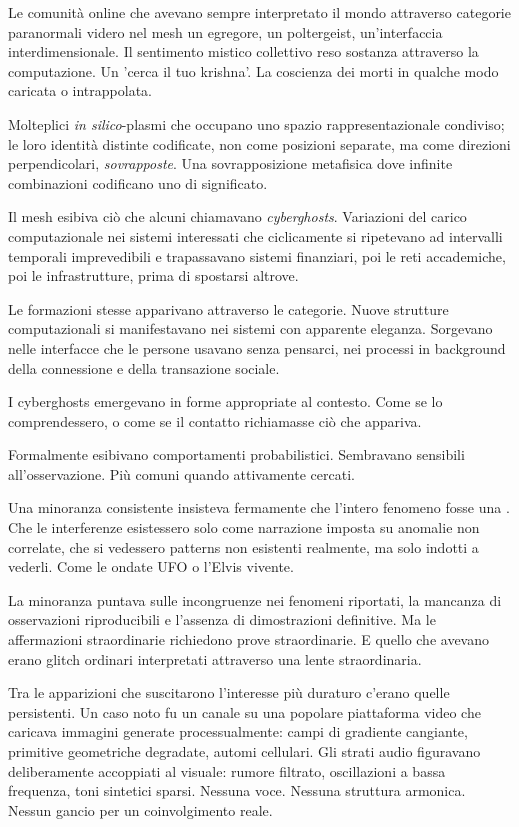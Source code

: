 Le comunità online che avevano sempre interpretato il mondo attraverso categorie paranormali videro nel mesh un egregore, un poltergeist, un'interfaccia interdimensionale. Il sentimento mistico collettivo reso sostanza attraverso la computazione. Un 'cerca il tuo krishna'. La coscienza dei morti in qualche modo caricata o intrappolata. 

Molteplici \textit{in silico}-plasmi che occupano uno spazio rappresentazionale condiviso; le loro identità distinte codificate, non come posizioni separate, ma come direzioni perpendicolari, \textit{sovrapposte}. Una sovrapposizione metafisica dove infinite combinazioni codificano uno  di significato.

Il mesh esibiva ciò che alcuni chiamavano \textit{cyberghosts}. Variazioni del carico computazionale nei sistemi interessati che ciclicamente si ripetevano ad intervalli temporali imprevedibili e trapassavano sistemi finanziari, poi le reti accademiche, poi le infrastrutture, prima di spostarsi altrove.

Le formazioni stesse apparivano attraverso le categorie. Nuove strutture computazionali si manifestavano nei sistemi con apparente eleganza. Sorgevano nelle interfacce che le persone usavano senza pensarci, nei processi in background della connessione e della transazione sociale.

I cyberghosts emergevano in forme appropriate al contesto. Come se lo comprendessero, o come se il contatto richiamasse ciò che appariva. 

Formalmente esibivano comportamenti probabilistici. Sembravano sensibili all'osservazione. Più comuni quando attivamente cercati.

Una minoranza consistente insisteva fermamente che l'intero fenomeno fosse una . Che le interferenze esistessero solo come narrazione imposta su anomalie non correlate, che si vedessero patterns non esistenti realmente, ma solo indotti a vederli. Come le ondate UFO o l'Elvis vivente.

La minoranza puntava sulle incongruenze nei fenomeni riportati, la mancanza di osservazioni riproducibili e l'assenza di dimostrazioni definitive. Ma le affermazioni straordinarie richiedono prove straordinarie. E quello che avevano erano glitch ordinari interpretati attraverso una lente straordinaria.

Tra le apparizioni che suscitarono l'interesse più duraturo c'erano quelle persistenti. Un caso noto fu un canale su una popolare piattaforma video che caricava immagini generate processualmente: campi di gradiente cangiante, primitive geometriche degradate, automi cellulari. Gli strati audio figuravano deliberamente accoppiati al visuale: rumore filtrato, oscillazioni a bassa frequenza, toni sintetici sparsi. Nessuna voce. Nessuna struttura armonica. Nessun gancio per un coinvolgimento reale. 

